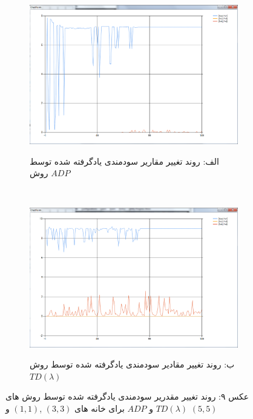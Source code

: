\documentclass[10pt,a4paper]{article}
\begin{document}
\begin{figure}[h]
        \centering
        \begin{subfigure}[b]{0.5\textwidth}
            \includegraphics[width=\textwidth]{r-adp}
            \begin{center}
                \textarabic{الف: روند تغییر مقاریر سودمندی یادگرفته شده توسط روش $ADP$ }
            \end{center}
        \end{subfigure}%
        ~ %
        \begin{subfigure}[b]{0.5\textwidth}
           \includegraphics[width=\textwidth]{r-td}
            \begin{center}
                \textarabic{ب: روند تغییر مقادیر سودمندی یادگرفته شده توسط روش $TD(\lambda)$ }
            \end{center}
        \end{subfigure}
    \begin{center}
    \textarabic{عکس ۹: روند تغییر مقدریر سودمندی یادگرفته شده توسط روش های
     $TD(\lambda)$ و $ADP$
      برای خانه های 
     $(3,3)$ ,$(1, 1)$ و $(5, 5)$
     }
    \end{center}
\end{figure}
\end{document}
